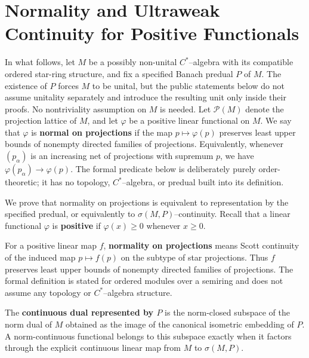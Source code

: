 \chapter{Normality and Ultraweak Continuity for Positive Functionals}

In what follows, let $M$ be a possibly non-unital $C^{*}$--algebra with its compatible ordered
star-ring structure, and fix a specified Banach predual $P$ of $M$. The existence of $P$ forces
$M$ to be unital, but the public statements below do not assume unitality separately and introduce
the resulting unit only inside their proofs. No nontriviality assumption on $M$ is needed. Let
$\mathcal{P}(M)$ denote the projection lattice of $M$, and let $\varphi$ be a positive
linear functional on $M$. We say that $\varphi$ is \textbf{normal on projections} if the map
$p\mapsto\varphi(p)$ preserves least upper bounds of nonempty directed families of projections.
Equivalently, whenever $(p_{\alpha})$ is an increasing net of projections with supremum $p$, we
have $\varphi(p_{\alpha})\to\varphi(p)$. The formal predicate below is deliberately purely
order-theoretic; it has no topology, $C^{*}$--algebra, or predual built into its definition.

We prove that normality on projections is equivalent to representation by the specified predual,
or equivalently to $\sigma(M,P)$--continuity. Recall that a linear functional $\varphi$ is
\textbf{positive} if $\varphi(x)\ge 0$ whenever $x\ge 0$.

\begin{definition}
  \label{def:normal_on_projections}
  \leanok
  For a positive linear map $f$, \textbf{normality on projections} means Scott continuity of the
  induced map $p\mapsto f(p)$ on the subtype of star projections. Thus $f$ preserves least upper
  bounds of nonempty directed families of projections. The formal definition is stated for
  ordered modules over a semiring and does not assume any topology or $C^{*}$--algebra structure.
\end{definition}

\begin{definition}
  \label{def:specified_ultraweak_dual}
  \leanok
  The \textbf{continuous dual represented by $P$} is the norm-closed subspace of the norm dual of
  $M$ obtained as the image of the canonical isometric embedding of $P$. A norm-continuous
  functional belongs to this subspace exactly when it factors through the explicit continuous
  linear map from $M$ to $\sigma(M,P)$.
\end{definition}

